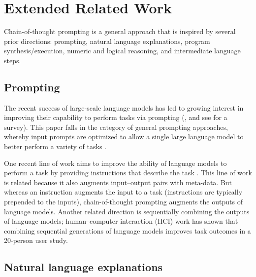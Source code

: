 \documentclass[]{article}
\theoremstyle{plain}
\theoremstyle{definition}
\theoremstyle{remark}
\begin{document}
\clearpage
\section{Extended Related Work}\label{sec:extended-related-work}

Chain-of-thought prompting is a general approach that is inspired by several prior directions: prompting, natural language explanations, program synthesis/execution, numeric and logical reasoning, and intermediate language steps.

\subsection{Prompting}

The recent success of large-scale language models has led to growing interest in improving their capability to perform tasks via prompting (\citet{brown2020language}, and see \citet{liu2021pre} for a survey).
This paper falls in the category of general prompting approaches, whereby input prompts are optimized to allow a single large language model to better perform a variety of tasks \citep[][\textit{inter alia}]{li-liang-2021-prefix,lester-etal-2021-power,reif2021recipe}.

One recent line of work aims to improve the ability of language models to perform a task by providing instructions that describe the task \citep{raffel2020exploring,wei2021finetuned,ouyang2022training,sanh2021multitask,wang2022benchmarking}.
This line of work is related because it also augments input--output pairs with meta-data. But whereas an instruction augments the input to a task (instructions are typically prepended to the inputs), chain-of-thought prompting augments the outputs of language models.
Another related direction is sequentially combining the outputs of language models; human--computer interaction (HCI) work \citep{wu2022promptchainer,wu2022ai} has shown that combining sequential generations of language models improves task outcomes in a 20-person user study.

\subsection{Natural language explanations}
\end{document}

